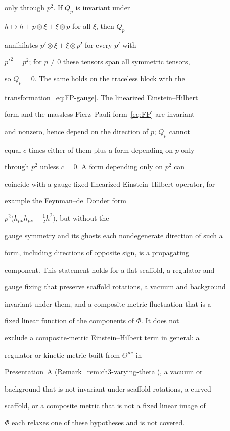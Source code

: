 only through \(p^2\). If \(Q_p\) is invariant under

\(h\mapsto h+p\otimes\xi+\xi\otimes p\) for all \(\xi\), then \(Q_p\)

annihilates \(p'\otimes\xi+\xi\otimes p'\) for every \(p'\) with

\(p'^2=p^2\); for \(p\neq0\) these tensors span all symmetric tensors,

so \(Q_p=0\). The same holds on the traceless block with the

transformation~\eqref{eq:FP-gauge}. The linearized Einstein--Hilbert

form and the massless Fierz--Pauli form~\eqref{eq:FP} are invariant

and nonzero, hence depend on the direction of \(p\); \(Q_p\) cannot

equal \(c\) times either of them plus a form depending on \(p\) only

through \(p^2\) unless \(c=0\). A form depending only on \(p^2\) can

coincide with a gauge-fixed linearized Einstein--Hilbert operator, for

example the Feynman--de~Donder form

\(p^2\bigl(h_{\mu\nu}h_{\mu\nu}-\tfrac12h^2\bigr)\), but without the

gauge symmetry and its ghosts each nondegenerate direction of such a

form, including directions of opposite sign, is a propagating

component. This statement holds for a flat scaffold, a regulator and

gauge fixing that preserve scaffold rotations, a vacuum and background

invariant under them, and a composite-metric fluctuation that is a

fixed linear function of the components of \(\Phi\). It does not

exclude a composite-metric Einstein--Hilbert term in general: a

regulator or kinetic metric built from \(\Theta^{\mu\nu}\) in

Presentation~A (Remark~\ref{rem:ch3-varying-theta}), a vacuum or

background that is not invariant under scaffold rotations, a curved

scaffold, or a composite metric that is not a fixed linear image of

\(\Phi\) each relaxes one of these hypotheses and is not covered.




